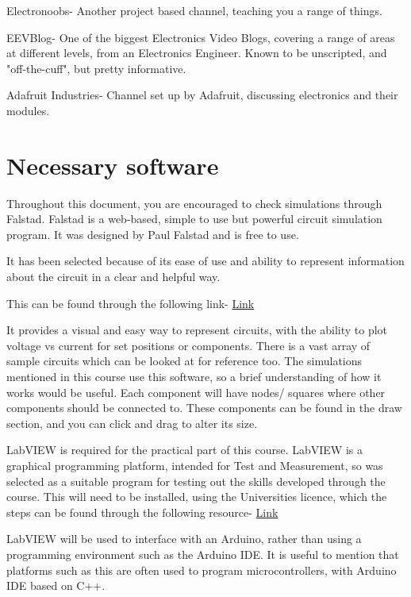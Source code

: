 \documentclass[a4paper,11pt]{report}
\begin{document}
Electronoobs- Another project based channel, teaching you a range of things.

EEVBlog- One of the biggest Electronics Video Blogs, covering a range of areas at different levels, from an Electronics Engineer. Known to be unscripted, and "off-the-cuff", but pretty informative.

Adafruit Industries- Channel set up by Adafruit, discussing electronics and their modules.

\section{Necessary software}

Throughout this document, you are encouraged to check simulations through Falstad. Falstad is a web-based, simple to use but powerful circuit simulation program. It was designed by Paul Falstad and is free to use.

It has been selected because of its ease of use and ability to represent information about the circuit in a clear and helpful way.

This can be found through the following link- \href{https://falstad.com/circuit/}{Link}

It provides a visual and easy way to represent circuits, with the ability to plot voltage vs current for set positions or components. There is a vast array of sample circuits which can be looked at for reference too. The simulations mentioned in this course use this software, so a brief understanding of how it works would be useful. Each component will have nodes/ squares where other components should be connected to. These components can be found in the draw section, and you can click and drag to alter its size.

LabVIEW is required for the practical part of this course. LabVIEW is a graphical programming platform, intended for Test and Measurement, so was selected as a suitable program for testing out the skills developed through the course. This will need to be installed, using the Universities licence, which the steps can be found through the following resource- \href{https://www.york.ac.uk/it-services/software/a-z/labview/#tab-2}{Link}

LabVIEW will be used to interface with an Arduino, rather than using a programming environment such as the Arduino IDE. It is useful to mention that platforms such as this are often used to program microcontrollers, with Arduino IDE based on C++.



\end{document}
